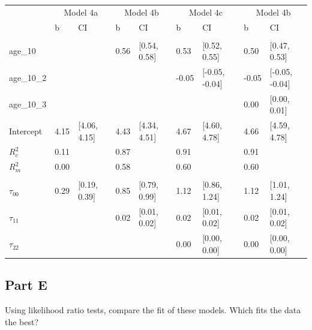 \documentclass[]{article}
\begin{document}
\begin{table}[H]
\centering
\begin{tabular}{lllllllll}
\toprule
\multicolumn{1}{c}{ } & \multicolumn{2}{c}{Model 4a} & \multicolumn{2}{c}{Model 4b} & \multicolumn{2}{c}{Model 4c} & \multicolumn{2}{c}{Model 4b} \\
\cmidrule(l{2pt}r{2pt}){2-3} \cmidrule(l{2pt}r{2pt}){4-5} \cmidrule(l{2pt}r{2pt}){6-7} \cmidrule(l{2pt}r{2pt}){8-9}
 & b & CI & b & CI & b & CI & b & CI\\
\midrule
\addlinespace[0.3em]
\multicolumn{9}{l}{\textbf{Fixed}}\\
\hspace{1em}age\_10 &  &  & 0.56 & [0.54, 0.58] & 0.53 & [0.52, 0.55] & 0.50 & [0.47, 0.53]\\
\hspace{1em}age\_10\_2 &  &  &  &  & -0.05 & [-0.05, -0.04] & -0.05 & [-0.05, -0.04]\\
\hspace{1em}age\_10\_3 &  &  &  &  &  &  & 0.00 & [0.00, 0.01]\\
\hspace{1em}Intercept & 4.15 & [4.06, 4.15] & 4.43 & [4.34, 4.51] & 4.67 & [4.60, 4.78] & 4.66 & [4.59, 4.78]\\
$R^2_c$ & 0.11 &  & 0.87 &  & 0.91 &  & 0.91 & \\
$R^2_m$ & 0.00 &  & 0.58 &  & 0.60 &  & 0.60 & \\
\addlinespace[0.3em]
\multicolumn{9}{l}{\textbf{Random}}\\
\hspace{1em}$\tau_{00}$ & 0.29 & [0.19, 0.39] & 0.85 & [0.79, 0.99] & 1.12 & [0.86, 1.24] & 1.12 & [1.01, 1.24]\\
\hspace{1em}$\tau_{11}$ &  &  & 0.02 & [0.01, 0.02] & 0.02 & [0.01, 0.02] & 0.02 & [0.01, 0.02]\\
\hspace{1em}$\tau_{22}$ &  &  &  &  & 0.00 & [0.00, 0.00] & 0.00 & [0.00, 0.00]\\
\bottomrule
\end{tabular}
\end{table}

\subsection{Part E}\label{part-e}

Using likelihood ratio tests, compare the fit of these models. Which
fits the data the best?
\end{document}
